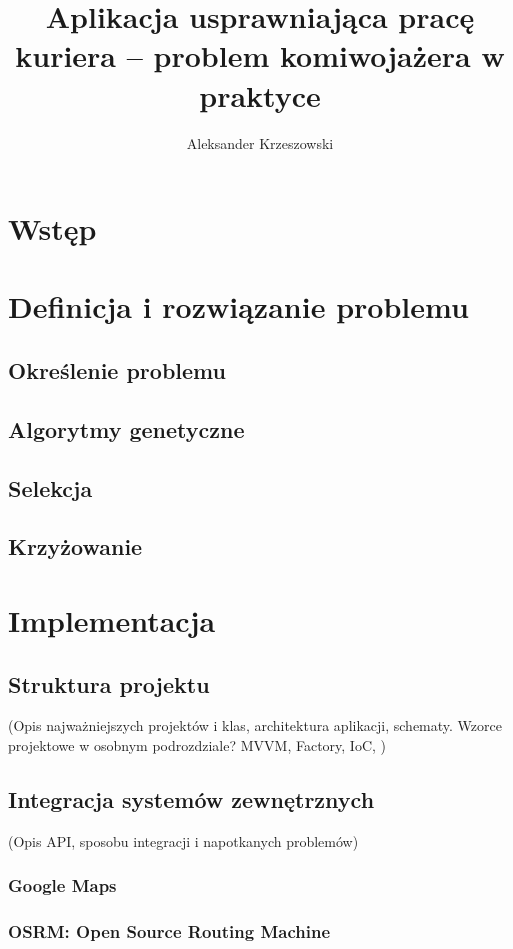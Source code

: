 \documentclass[12pt,a4paper]{report}
\begin{document}
	\author{Aleksander Krzeszowski}
	\title{Aplikacja usprawniająca pracę kuriera -- problem komiwojażera w praktyce}
	
	
	
	\tableofcontents
	
	\chapter*{Wstęp}
		
	\chapter{Definicja i rozwiązanie problemu}
		\label{ch:definicja_i_rozwiazanie}
		\section{Określenie problemu}
			
		\section{Algorytmy genetyczne}
		\section{Selekcja}
		\section{Krzyżowanie}
			
	\chapter{Implementacja}
		\section{Struktura projektu}
			(Opis najważniejszych projektów i klas, architektura aplikacji, schematy. Wzorce projektowe w osobnym podrozdziale? MVVM, Factory, IoC, )
			
		\section{Integracja systemów zewnętrznych}
			(Opis API, sposobu integracji i napotkanych problemów)
			\subsection{Google Maps}
			\subsection{OSRM: Open Source Routing Machine}
\end{document}
